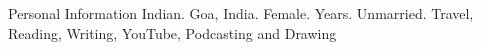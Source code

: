 \begin{rubric}{Personal Information}
\entry*[Nationality]
	Indian.
	Goa, India.
\entry*[Gender]
	Female.
 Years.	
	Unmarried.	
\entry*[Hobbies]
	Travel, Reading, Writing, YouTube, Podcasting and Drawing	

\end{rubric}
